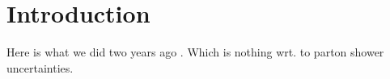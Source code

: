 \section{Introduction}
\label{sec:psunc:intro}

Here is what we did two years ago \cite{AlcarazMaestre:2012vp}. Which is 
nothing wrt. to parton shower uncertainties.

